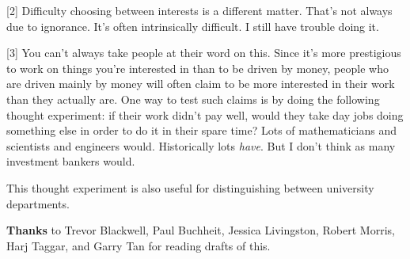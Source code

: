 {[}2{]} Difficulty choosing between interests is a different matter.
That's not always due to ignorance. It's often intrinsically difficult.
I still have trouble doing it.

{[}3{]} You can't always take people at their word on this. Since it's
more prestigious to work on things you're interested in than to be
driven by money, people who are driven mainly by money will often claim
to be more interested in their work than they actually are. One way to
test such claims is by doing the following thought experiment: if their
work didn't pay well, would they take day jobs doing something else in
order to do it in their spare time? Lots of mathematicians and
scientists and engineers would. Historically lots \emph{have}. But I
don't think as many investment bankers would.

This thought experiment is also useful for distinguishing between
university departments.

\textbf{Thanks} to Trevor Blackwell, Paul Buchheit, Jessica Livingston,
Robert Morris, Harj Taggar, and Garry Tan for reading drafts of this.
